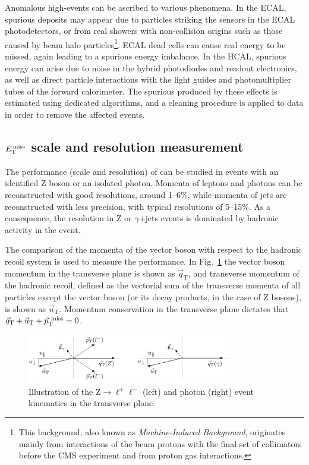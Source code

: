 Anomalous high-\MET events can be ascribed to various phenomena. In the ECAL, spurious deposits may appear due to particles striking the sensors in the ECAL photodetectors, or from real showers with non-collision origins such as those caused by beam halo particles\footnote{This background, also known as \emph{Machine-Induced Background}, originates mainly from interactions of the beam protons with the final set of collimators before the CMS experiment and from proton gas interactions.}. ECAL dead cells can cause real energy to be missed, again leading to a spurious energy imbalance. In the HCAL, spurious energy can arise due to noise in the hybrid photodiodes and readout electronics, as well as direct particle interactions with the light guides and photomultiplier tubes of the forward calorimeter. The spurious \MET produced by these effects is estimated using dedicated algorithms, and a cleaning procedure is applied to data in order to remove the affected events.

\subsection[\MET scale and resolution measurement]{\boldmath$E_\mathrm{T}^\mathrm{\,miss}$ scale and resolution measurement}
The performance (scale and resolution) of \MET can be studied in events with an identified Z boson or an isolated photon. Momenta of leptons and photons can be reconstructed with good resolutions, around 1--6\%, while momenta of jets are reconstructed with less precision, with typical resolutions of 5--15\%. As a consequence, the \MET resolution in Z or $\gamma$+jets events is dominated by hadronic activity in the event.

The comparison of the momenta of the vector boson with respect to the hadronic recoil system is used to measure the \MET performance. In Fig.~\ref{fig:metZgamma} the vector boson momentum in the transverse plane is shown as $\vec{q}_\mathrm{T}$, and transverse momentum of the hadronic recoil, defined as the vectorial sum of the transverse momenta of all particles except the vector boson (or its decay products, in the
case of Z bosons), is shown as $\vec{u}_\mathrm{T}$. Momentum conservation in the transverse plane dictates that $\vec{q}_\mathrm{T} + \vec{u}_\mathrm{T} + \vec{p}_\mathrm{T}^\mathrm{~miss} = 0$.

\begin{figure}[htb]
\centering
\includegraphics[width=0.8\textwidth]{images/metZgamma.pdf}
\caption{Illustration of the $\mathrm{Z\to\ell^+\ell^-}$ (left) and photon (right) event kinematics in the transverse plane.}\label{fig:metZgamma}
\end{figure}

